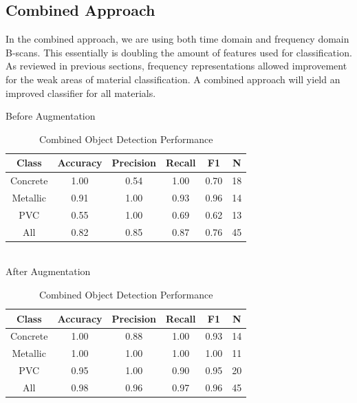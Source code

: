 \subsection{Combined Approach}
In the combined approach, we are using both time domain and frequency domain B-scans. This essentially is doubling the amount of features used for classification. As reviewed in previous sections, frequency representations allowed improvement for the weak areas of material classification. A combined approach will yield an improved classifier for all materials. 

\begin{table}[H]
\begin{center}
    Before Augmentation\\
    \begin{tabular}{ |c|c|c|c|c|c|}
        \hline
        Class & Accuracy & Precision & Recall & F1 & N \\
        \hline
        Concrete & 1.00 & 0.54 & 1.00 & 0.70 & 18\\ 
        Metallic & 0.91 & 1.00 & 0.93 & 0.96 & 14\\  
        PVC      & 0.55 & 1.00 & 0.69 & 0.62 & 13\\
        \hline
        All      & 0.82 & 0.85 & 0.87 & 0.76 & 45\\
        \hline
    \end{tabular}\\
    After Augmentation\\
    \begin{tabular}{ |c|c|c|c|c|c|}
        \hline
        Class & Accuracy & Precision & Recall & F1 & N \\
        \hline
        Concrete & 1.00 & 0.88 & 1.00 & 0.93 & 14\\ 
        Metallic & 1.00 & 1.00 & 1.00 & 1.00 & 11\\  
        PVC      & 0.95 & 1.00 & 0.90 & 0.95 & 20\\
        \hline
        All      & 0.98 & 0.96 & 0.97 & 0.96 & 45\\
        \hline
    \end{tabular}
\end{center}
\caption{Combined Object Detection Performance}
\label{table:combined_table}
\end{table}

